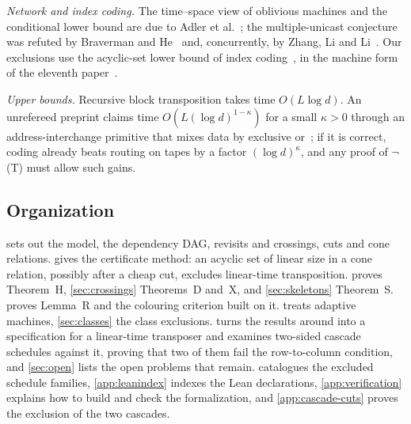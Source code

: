 \emph{Network and index coding.} The time--space view of oblivious machines and the conditional lower bound are due to Adler et
al.~\cite{AHJKL2006}; the multiple-unicast conjecture was refuted by Braverman and He~\cite{BravermanHe2026} and, concurrently, by Zhang, Li
and Li~\cite{ZhangLiLi2026}. Our exclusions use the acyclic-set lower bound of index coding~\cite{BBJK2011}, in the machine form of the
eleventh paper~\cite{MergeDepth2026}.

\emph{Upper bounds.} Recursive block transposition takes time $O(L\log d)$. An unrefereed preprint claims time
$O(L(\log d)^{1-\kappa})$ for a small $\kappa>0$ through an address-interchange primitive that mixes data by exclusive
or~\cite{OpenAI2026mult}; if it is correct, coding already beats routing on tapes by a factor $(\log d)^{\kappa}$, and any
proof of $\neg$(T) must allow such gains.

\subsection{Organization}

 sets out the model, the dependency DAG, revisits and crossings, cuts and cone relations. 
gives the certificate method: an acyclic set of linear size in a cone relation, possibly after a cheap cut, excludes linear-time
transposition.  proves Theorem~H, \cref{sec:crossings} Theorems~D and~X, and \cref{sec:skeletons} Theorem~S.
 proves Lemma~R and the colouring criterion built on it.  treats adaptive machines,
\cref{sec:classes} the class exclusions.  turns the results around into a specification for a linear-time
transposer and examines two-sided cascade schedules against it, proving that two of them fail the row-to-column condition, and
\cref{sec:open} lists the open problems that remain.  catalogues the excluded schedule families,
\cref{app:leanindex} indexes the Lean declarations, \cref{app:verification} explains how to build and check the formalization, and
\cref{app:cascade-cuts} proves the exclusion of the two cascades.
